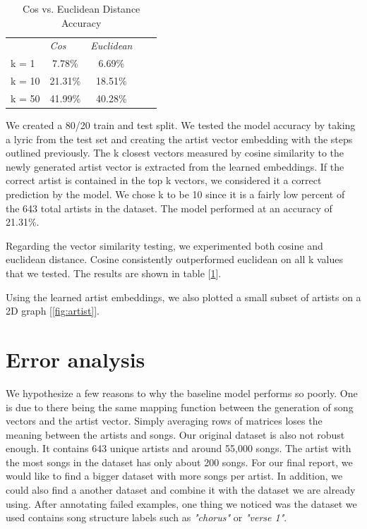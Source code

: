 \documentclass[11pt,a4paper]{article}
\begin{document}
\begin{table}[]
\centering
\begin{tabular}{lllll}
\multicolumn{1}{l|}{} & \multicolumn{1}{l|}{\textit{Cos}} & \textit{Euclidean} &  &  \\ \cline{1-3}
\multicolumn{1}{l|}{k = 1} & \multicolumn{1}{c|}{7.78\%} & \multicolumn{1}{c}{6.69\%} &  &  \\ \cline{1-3}
\multicolumn{1}{l|}{k = 10} & \multicolumn{1}{c|}{21.31\%} & \multicolumn{1}{c}{18.51\%} &  &  \\ \cline{1-3}
\multicolumn{1}{l|}{k = 50} & \multicolumn{1}{c|}{41.99\%} & \multicolumn{1}{c}{40.28\%} &  &  \\

\end{tabular}
\caption{Cos vs. Euclidean Distance Accuracy}
\label{table:similarity_table}


\end{table}

We created a 80/20 train and test split. We tested the model accuracy by taking a lyric from the test set and creating the artist vector embedding with the steps outlined previously. The k closest vectors measured by cosine similarity to the newly generated artist vector is extracted from the learned embeddings. If the correct artist is contained in the top k vectors, we considered it a correct prediction by the model. We chose k to be 10 since it is a fairly low percent of the 643 total artists in the dataset. The model performed at an accuracy of 21.31\%. 

Regarding the vector similarity testing, we experimented both cosine and euclidean distance. Cosine consistently outperformed euclidean on all k values that we tested. The results are shown in table [\ref{table:similarity_table}].

Using the learned artist embeddings, we also plotted a small subset of artists on a 2D graph [\ref{fig:artist}].


    
    \section{Error analysis}


We hypothesize a few reasons to why the baseline model performs so poorly. One is due to there being the same mapping function between the generation of song vectors and the artist vector. Simply averaging rows of matrices loses the meaning between the artists and songs. Our original dataset is also not robust enough. It contains 643 unique artists and around 55,000 songs. The artist with the most songs in the dataset has only about 200 songs. For our final report, we would like to find a bigger dataset with more songs per artist. In addition, we could also find a another dataset and combine it with the dataset we are already using. After annotating failed examples, one thing we noticed was the dataset we used contains song structure labels such as \textit{"chorus"} or \textit{"verse 1"}.
\end{document}
